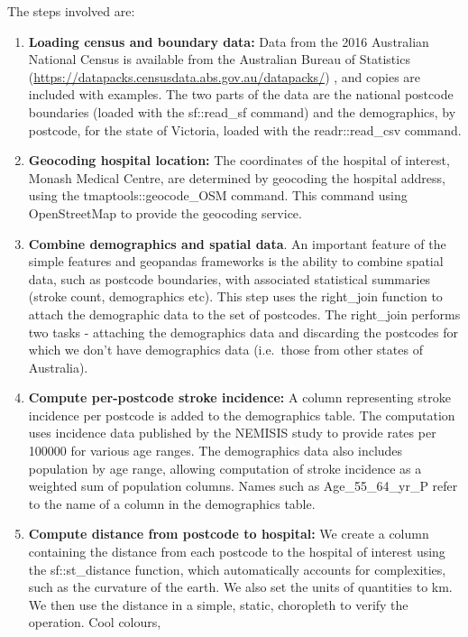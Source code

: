 \documentclass[utf8]{frontiersHLTH}
\begin{document}
The steps involved are:

\begin{enumerate}
\def\labelenumi{\arabic{enumi}.}
\item
  {\bf Loading census and boundary data:} Data from the 2016 Australian
  National Census is available from the Australian Bureau of Statistics
  (\url{https://datapacks.censusdata.abs.gov.au/datapacks/}) , and
  copies are included with examples. The two parts of the data are the
  national postcode boundaries (loaded with the sf::read\_sf command)
  and the demographics, by postcode, for the state of Victoria, loaded
  with the readr::read\_csv command.
\item
  {\bf Geocoding hospital location:} The coordinates of the hospital of
  interest, Monash Medical Centre, are determined by geocoding the
  hospital address, using the tmaptools::geocode\_OSM command. This
  command using OpenStreetMap to provide the geocoding service.
\item
  {\bf Combine demographics and spatial data}. An important feature of the
  simple features and geopandas frameworks is the ability to combine
  spatial data, such as postcode boundaries, with associated statistical
  summaries (stroke count, demographics etc). This step uses the
  right\_join function to attach the demographic data to the set of
  postcodes. The right\_join performs two tasks - attaching the
  demographics data and discarding the postcodes for which we don't have
  demographics data (i.e.~those from other states of Australia).
\item
  {\bf Compute per-postcode stroke incidence:} A column representing stroke
  incidence per postcode is added to the demographics table. The
  computation uses incidence data published by the NEMISIS\cite{thrift_stroke_2000}
  study to provide rates per 100000 for various age ranges. The
  demographics data also includes population by age range, allowing
  computation of stroke incidence as a weighted sum of population
  columns. Names such as Age\_55\_64\_yr\_P refer to the name of a
  column in the demographics table.
\item
  {\bf Compute distance from postcode to hospital:} We create a column
  containing the distance from each postcode to the hospital of interest
  using the sf::st\_distance function, which automatically accounts for
  complexities, such as the curvature of the earth. We also set the
  units of quantities to km. We then use the distance in a simple,
  static, choropleth to verify the operation. Cool colours,

\end{enumerate}
\end{document}
